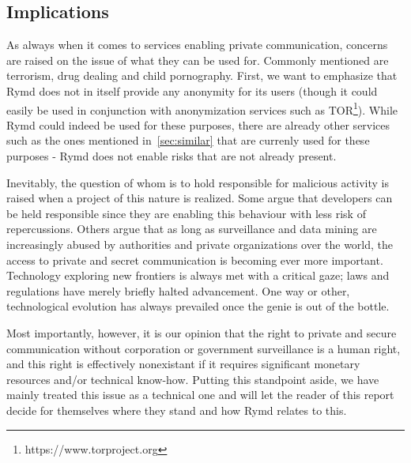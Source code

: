 \subsection{Implications}
As always when it comes to services enabling private communication, concerns are raised on the issue of what they can be used for. Commonly mentioned are terrorism, drug dealing and child pornography. First, we want to emphasize that Rymd does not in itself provide any anonymity for its users (though it could easily be used in conjunction with anonymization services such as TOR\footnote{https://www.torproject.org}). While Rymd could indeed be used for these purposes, there are already other services such as the ones mentioned in~\ref{sec:similar} that are currenly used for these purposes - Rymd does not enable risks that are not already present.

Inevitably, the question of whom is to hold responsible for malicious activity is raised when a project of this nature is realized. Some argue that developers can be held responsible since they are enabling this behaviour with less risk of repercussions. Others argue that as long as surveillance and data mining are increasingly abused by authorities and private organizations over the world, the access to private and secret communication is becoming ever more important. Technology exploring new frontiers is always met with a critical gaze; laws and regulations have merely briefly halted advancement. One way or other, technological evolution has always prevailed once the genie is out of the bottle. 

Most importantly, however, it is our opinion that the right to private and secure communication without corporation or government surveillance is a human right, and this right is effectively nonexistant if it requires significant monetary resources and/or technical know-how. Putting this standpoint aside, we have mainly treated this issue as a technical one and will let the reader of this report decide for themselves where they stand and how Rymd relates to this.

